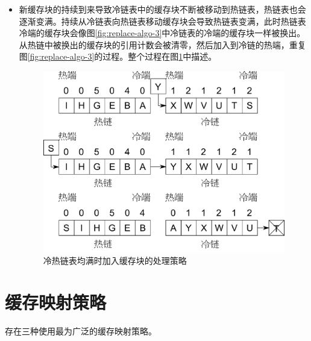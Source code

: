 \begin{itemize}
\item
新缓存块的持续到来导致冷链表中的缓存块不断被移动到热链表，热链表也会逐渐变满。持续从冷链表向热链表移动缓存块会导致热链表变满，此时热链表冷端的缓存块会像图\ref{fig:replace-algo-3}中冷链表的冷端的缓存块一样被换出。从热链中被换出的缓存块的引用计数会被清零，然后加入到冷链的热端，重复图\ref{fig:replace-algo-3}的过程。整个过程在图\ref{fig:replace-algo-4}中描述。
\begin{figure}[H]
\centering
\includegraphics[width=0.7\linewidth]{./graph/replace-algo-4}
\caption{冷热链表均满时加入缓存块的处理策略}
\label{fig:replace-algo-4}
\end{figure}
\end{itemize}

\section{缓存映射策略}
\label{sec:cache_mapping}

存在三种使用最为广泛的缓存映射策略。

